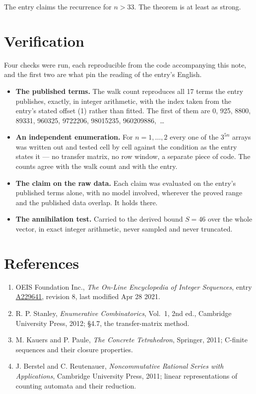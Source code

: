 \documentclass[11pt]{article}
\theoremstyle{definition}
\begin{document}
The entry claims the recurrence for $n > 33$. The theorem is at least as strong.

\section{Verification}

Four checks were run, each reproducible from the code accompanying this note, and the first two are what pin the reading of the entry's English.

\begin{itemize}

\item {\bfseries The published terms.} The walk count reproduces all 17 terms the entry publishes, exactly, in integer arithmetic, with the index taken from the entry's stated offset (1) rather than fitted. The first of them are 0, 925, 8800, 89331, 960325, 9722206, 98015235, 960209886,~\dots

\item {\bfseries An independent enumeration.} For $n = 1,\dots,2$ every one of the $3^{5n}$ arrays was written out and tested cell by cell against the condition as the entry states it --- no transfer matrix, no row window, a separate piece of code. The counts agree with the walk count and with the entry.

\item {\bfseries The claim on the raw data.} Each claim was evaluated on the entry's published terms alone, with no model involved, wherever the proved range and the published data overlap. It holds there.

\item {\bfseries The annihilation test.} Carried to the derived bound $S = 46$ over the whole vector, in exact integer arithmetic, never sampled and never truncated.

\end{itemize}

\section{References}

\begin{enumerate}

\item OEIS Foundation Inc., \emph{The On-Line Encyclopedia of Integer Sequences}, entry \href{https://oeis.org/A229641}{A229641}, revision 8, last modified Apr 28 2021.

\item R. P. Stanley, \emph{Enumerative Combinatorics}, Vol.~1, 2nd ed., Cambridge University Press, 2012; \S4.7, the transfer-matrix method.

\item M. Kauers and P. Paule, \emph{The Concrete Tetrahedron}, Springer, 2011; C-finite sequences and their closure properties.

\item J. Berstel and C. Reutenauer, \emph{Noncommutative Rational Series with Applications}, Cambridge University Press, 2011; linear representations of counting automata and their reduction.

\end{enumerate}
\end{document}
